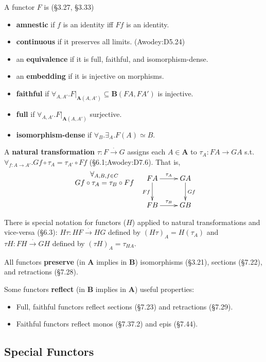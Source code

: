 \documentclass[10pt,twocolumn,letterpaper]{article}
\newcommand{\natto}{\overset{\cdot}{\to}}
\newcommand{\defn}[1]{{\bf #1}}
\begin{document}
  A functor $F$ is (\S3.27, \S3.33)
  \begin{itemize}
    \item \defn{amnestic} if $f$ is an identity iff $Ff$ is an identity.
    \item \defn{continuous} if it preserves all limits. (Awodey:D5.24)
    \item an \defn{equivalence} if it is full, faithful, and
      isomorphism-dense.
    \item an \defn{embedding} if it is injective on morphisms.
    \item \defn{faithful} if $\forall_{A,A'} . F\vert_{\mathbf{A}(A,A')}
      \subseteq \mathbf{B}(FA, FA')$ is injective.
    \item \defn{full} if $\forall_{A,A'} . F\vert_{\mathbf{A}(A,A')}$ surjective.
    \item \defn{isomorphism-dense} if $\forall_B . \exists_A . F(A) \simeq B$.
  \end{itemize}

  A \defn{natural transformation} $\tau : F \natto G$ assigns each
  $A \in \mathbf{A}$ to $\tau_A : FA \to GA$ s.t.
  $\forall_{f : A \to A'} . G f \circ \tau_A = \tau_{A'} \circ F f$
  (\S6.1;Awodey:D7.6).
  That is,
  \[\xymatrix{
     {}\save[]+<-1cm,0cm>*\txt<8pc>{$\forall_{A,B,f \in C}$\\$Gf\circ \tau_A = \tau_B\circ Ff$}\restore
      & FA \ar[r]^{\tau_A} \ar[d]_{Ff} & GA \ar[d]^{Gf} \\
      & FB \ar[r]^{\tau_B}             & GB} \]

  There is special notation for functors ($H$) applied to natural
  transformations and vice-versa (\S6.3): $H\tau : HF \natto HG$ defined by
  $(H\tau)_A = H(\tau_A)$ and $\tau H : FH \natto GH$ defined by $(\tau H)_A
  = \tau_{HA}$.

  All functors \defn{preserve} (in $\mathbf{A}$ implies in $\mathbf{B}$) 
  isomorphisms (\S3.21), sections (\S7.22), and retractions (\S7.28).

  Some functors \defn{reflect} (in $\mathbf{B}$ implies in $\mathbf{A}$) useful properties:
  \begin{itemize}
      \item Full, faithful functors reflect sections (\S7.23) and retractions (\S7.29).
      \item Faithful functors reflect monos (\S7.37.2) and epis (\S7.44).
  \end{itemize}

\subsection{Special Functors}
\end{document}
